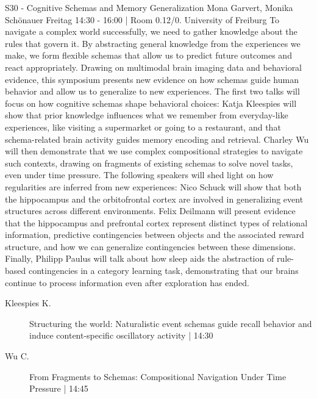 
            \begin{symposium}
            {S30 - Cognitive Schemas and Memory Generalization}
            {Mona Garvert, Monika Schönauer}
            {Freitag 14:30 - 16:00 | Room 0.12/0.}
            {University of Freiburg}
            To navigate a complex world successfully, we need to gather knowledge about the rules that govern it. By abstracting general knowledge from the experiences we make, we form flexible schemas that allow us to predict future outcomes and react appropriately. Drawing on multimodal brain imaging data and behavioral evidence, this symposium presents new evidence on how schemas guide human behavior and allow us to generalize to new experiences. The first two talks will focus on how cognitive schemas shape behavioral choices: Katja Kleespies will show that prior knowledge influences what we remember from everyday-like experiences, like visiting a supermarket or going to a restaurant, and that schema-related brain activity guides memory encoding and retrieval. Charley Wu will then demonstrate that we use complex compositional strategies to navigate such contexts, drawing on fragments of existing schemas to solve novel tasks, even under time pressure. The following speakers will shed light on how regularities are inferred from new experiences: Nico Schuck will show that both the hippocampus and the orbitofrontal cortex are involved in generalizing event structures across different environments. Felix Deilmann will present evidence that the hippocampus and prefrontal cortex represent distinct types of relational information, predictive contingencies between objects and the associated reward structure, and how we can generalize contingencies between these dimensions. Finally, Philipp Paulus will talk about how sleep aids the abstraction of rule-based contingencies in a category learning task, demonstrating that our brains continue to process information even after exploration has ended.
            \begin{description}    
            
                \item [ Kleespies K.] Structuring the world: Naturalistic event schemas guide recall behavior and induce content-specific oscillatory activity \textcolor{mygray}{ | 14:30}    
                
                \item [ Wu C.] From Fragments to Schemas: Compositional Navigation Under Time Pressure \textcolor{mygray}{ | 14:45}    
                

\end{description}
\end{symposium}
